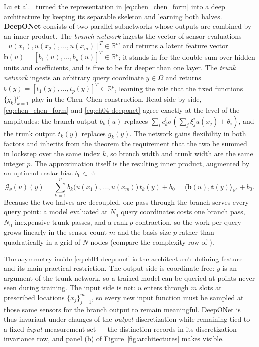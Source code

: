 Lu et al.~\cite{lu2021learning} turned the representation in \eqref{eq:chen_chen_form} into a deep architecture by keeping its separable skeleton and learning both halves. \textbf{DeepONet} consists of two parallel subnetworks whose outputs are combined by an inner product. The \emph{branch network} ingests the vector of sensor evaluations $[u(x_1),u(x_2),\dots,u(x_m)]^{T}\in\mathbb{R}^{m}$ and returns a latent feature vector $\mathbf{b}(u)=[b_1(u),\dots,b_p(u)]^{T}\in\mathbb{R}^{p}$; it stands in for the double sum over hidden units and coefficients, and is free to be far deeper than one layer. The \emph{trunk network} ingests an arbitrary query coordinate $y\in\Omega$ and returns $\mathbf{t}(y)=[t_1(y),\dots,t_p(y)]^{T}\in\mathbb{R}^{p}$, learning the role that the fixed functions $\{g_{k}\}_{k=1}^{p}$ play in the Chen--Chen construction. Read side by side, \eqref{eq:chen_chen_form} and \eqref{eq:ch04-deeponet} agree exactly at the level of the amplitudes: the branch output $b_{k}(u)$ replaces $\sum_{i}c_{k}^{i}\sigma(\sum_{j}\xi_{j}^{i}u(x_{j})+\theta_{i})$, and the trunk output $t_{k}(y)$ replaces $g_{k}(y)$. The network gains flexibility in both factors and inherits from the theorem the requirement that the two be summed in lockstep over the same index $k$, so branch width and trunk width are the same integer $p$. The approximation itself is the resulting inner product, augmented by an optional scalar bias $b_{0}\in\mathbb{R}$:
\begin{equation}
  \label{eq:ch04-deeponet}
  \mathcal{G}_\theta(u)(y) = \sum_{k=1}^p b_k\big( u(x_1), \dots, u(x_m) \big) \, t_k(y) + b_0 = \langle \mathbf{b}(u), \mathbf{t}(y) \rangle_{\mathbb{R}^p} + b_0.
\end{equation}
Because the two halves are decoupled, one pass through the branch serves every query point: a model evaluated at $N_{\mathrm{q}}$ query coordinates costs one branch pass, $N_{\mathrm{q}}$ inexpensive trunk passes, and a rank-$p$ contraction, so the work per query grows linearly in the sensor count $m$ and the basis size $p$ rather than quadratically in a grid of $N$ nodes (compare the complexity row of ).

The asymmetry inside \eqref{eq:ch04-deeponet} is the architecture's defining feature and its main practical restriction. The output side is coordinate-free: $y$ is an argument of the trunk network, so a trained model can be queried at points never seen during training. The input side is not: $u$ enters through $m$ slots at prescribed locations $\{x_{j}\}_{j=1}^{m}$, so every new input function must be sampled at those same sensors for the branch output to remain meaningful. DeepONet is thus invariant under changes of the \emph{output} discretization while remaining tied to a fixed \emph{input} measurement set --- the distinction  records in its discretization-invariance row, and panel (b) of Figure~\ref{fig:architectures} makes visible.

